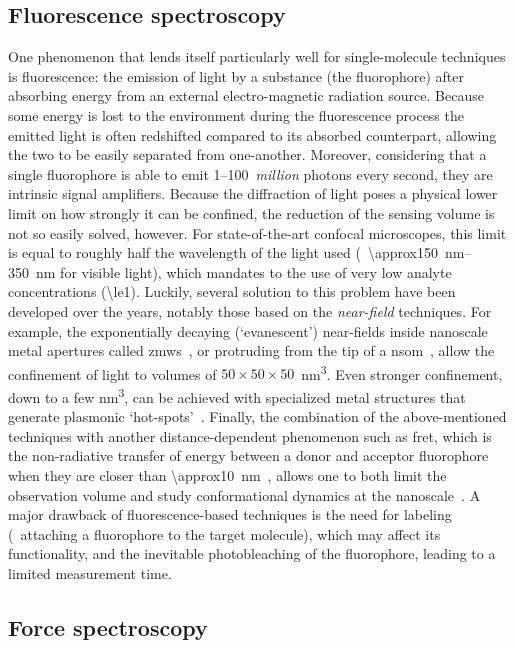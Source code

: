 \subsection{Fluorescence spectroscopy}
%

One phenomenon that lends itself particularly well for single-molecule techniques is fluorescence: the
emission of light by a substance (the fluorophore) after absorbing energy from an external electro-magnetic
radiation source. Because some energy is lost to the environment during the fluorescence process the emitted
light is often redshifted compared to its absorbed counterpart, allowing the two to be easily separated from
one-another. Moreover, considering that a single fluorophore is able to emit \numrange{1}{100}~\emph{million}
photons every second, they are intrinsic signal amplifiers. Because the diffraction of light poses a physical
lower limit on how strongly it can be confined, the reduction of the sensing volume is not so easily solved,
however. For state-of-the-art confocal microscopes, this limit is equal to roughly half the wavelength of the
light used (\ie~\SIrange{\approx150}{350}{\nm} for visible light), which mandates to the use of very low
analyte concentrations (\SI{\le1}{\nM}). Luckily, several solution to this problem have been developed over
the years, notably those based on the \emph{near-field} techniques. For example, the exponentially decaying
(`evanescent') near-fields inside nanoscale metal apertures called
\glspl{zmw}~\cite{Levene-2003,Eid-2009,Zhu-2012}, or protruding from the tip of a
\gls{nsom}~\cite{Ambrose-1994,Hosaka-2001}, allow the confinement of light to volumes of
$50\times50\times50$~\si{\cubic\nm}. Even stronger confinement, down to a few \si{\cubic\nm}, can be achieved
with specialized metal structures that generate plasmonic `hot-spots'~\cite{Xin-Lu-2019}. Finally, the
combination of the above-mentioned techniques with another distance-dependent phenomenon such as \gls{fret},
which is the non-radiative transfer of energy between a donor and acceptor fluorophore when they are closer
than \SI{\approx10}{\nm}~\cite{Roy-2008}, allows one to both limit the observation volume and study
conformational dynamics at the nanoscale~\cite{Kim-2013}. A major drawback of fluorescence-based techniques is
the need for labeling (\ie~attaching a fluorophore to the target molecule), which may affect its
functionality, and the inevitable photobleaching of the fluorophore, leading to a limited measurement time.


\subsection{Force spectroscopy}
%

